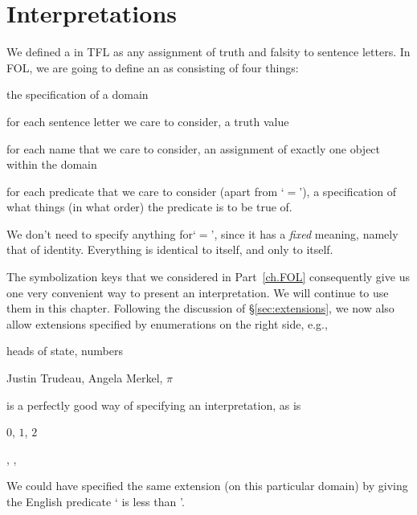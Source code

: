 \section{Interpretations}
We defined a  in TFL as any assignment of truth and falsity to sentence letters. In FOL, we are going to define an  as consisting of four things:
	\begin{ebullet}
		\item the specification of a domain
		\item for each sentence letter we care to consider, a truth value
		\item for each name that we care to consider, an assignment of exactly one object within the domain
		\item for each predicate that we care to consider (apart from
		`$=$'), a specification of what things (in what order) the
		predicate is to be true of.
	\end{ebullet}
We don't need to specify anything for`$=$', since it has a
\emph{fixed} meaning, namely that of identity. Everything is identical
to itself, and only to itself. 

The symbolization keys that we considered in Part~\ref{ch.FOL} consequently give us one very convenient way to present an interpretation. We will continue to use them in this chapter. Following the discussion of \S\ref{sec:extensions}, we now also allow extensions specified by enumerations on the right side, e.g.,
\begin{ekey}
	\item[\text{domain}] heads of state, numbers
	\item[\atom{H}{x}] Justin Trudeau, Angela Merkel, $\pi$
\end{ekey}
is a perfectly good way of specifying an interpretation, as is
\begin{ekey}
	\item[\text{domain}] $0$, $1$, $2$
	\item[\atom{L}{x,y}] , , 
\end{ekey}
We could have specified the same extension (on this particular domain) by giving the English predicate ` is less than '.



